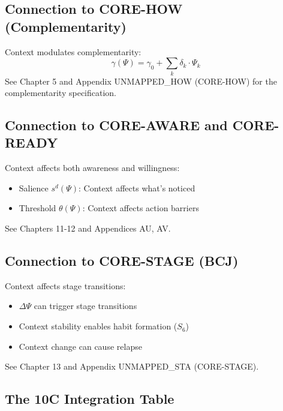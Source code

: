 \subsection{Connection to CORE-HOW (Complementarity)}

\begin{cross-reference}
Context modulates complementarity:
\begin{equation}
\gamma(\Psi) = \gamma_0 + \sum_k \delta_k \cdot \Psi_k
\end{equation}
See Chapter 5 and Appendix UNMAPPED_HOW (CORE-HOW) for the complementarity specification.
\end{cross-reference}

\subsection{Connection to CORE-AWARE and CORE-READY}

\begin{cross-reference}
Context affects both awareness and willingness:
\begin{itemize}[nosep]
  \item Salience $s^d(\Psi)$: Context affects what's noticed
  \item Threshold $\theta(\Psi)$: Context affects action barriers
\end{itemize}
See Chapters 11-12 and Appendices AU, AV.
\end{cross-reference}

\subsection{Connection to CORE-STAGE (BCJ)}

\begin{cross-reference}
Context affects stage transitions:
\begin{itemize}[nosep]
  \item $\Delta\Psi$ can trigger stage transitions
  \item Context stability enables habit formation ($S_6$)
  \item Context change can cause relapse
\end{itemize}
See Chapter 13 and Appendix UNMAPPED_STA (CORE-STAGE).
\end{cross-reference}

\subsection{The 10C Integration Table}

